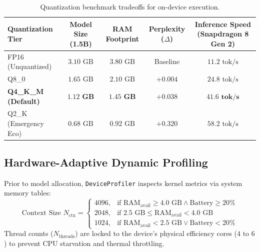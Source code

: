 \documentclass[10.5pt,a4paper]{article}
\begin{document}
\begin{table}[h!]
\centering
\footnotesize
\begin{tabularx}{\textwidth}{lcccc}
\toprule
\textbf{Quantization Tier} & \textbf{Model Size (1.5B)} & \textbf{RAM Footprint} & \textbf{Perplexity ($\Delta$)} & \textbf{Inference Speed (Snapdragon 8 Gen 2)} \\
\midrule
FP16 (Unquantized) & $3.10\text{ GB}$ & $3.80\text{ GB}$ & Baseline & $11.2\text{ tok/s}$ \\
Q8\_0 & $1.65\text{ GB}$ & $2.10\text{ GB}$ & $+0.004$ & $24.8\text{ tok/s}$ \\
\textbf{Q4\_K\_M (Default)} & $\mathbf{1.12\text{ GB}}$ & $\mathbf{1.45\text{ GB}}$ & $\mathbf{+0.038}$ & $\mathbf{41.6\text{ tok/s}}$ \\
Q2\_K (Emergency Eco) & $0.68\text{ GB}$ & $0.92\text{ GB}$ & $+0.320$ & $58.2\text{ tok/s}$ \\
\bottomrule
\end{tabularx}
\caption{Quantization benchmark tradeoffs for on-device execution.}
\label{tab:quantization}
\end{table}

\vspace{-0.2cm}

\subsection{Hardware-Adaptive Dynamic Profiling}
Prior to model allocation, \texttt{DeviceProfiler} inspects kernel metrics via system memory tables:
\begin{equation}
  \text{Context Size } N_{\text{ctx}} = 
  \begin{cases} 
    4096, & \text{if } \text{RAM}_{\text{avail}} \ge 4.0\text{ GB} \land \text{Battery} \ge 20\% \\
    2048, & \text{if } 2.5\text{ GB} \le \text{RAM}_{\text{avail}} < 4.0\text{ GB} \\
    1024, & \text{if } \text{RAM}_{\text{avail}} < 2.5\text{ GB} \lor \text{Battery} < 20\%
  \end{cases}
\end{equation}
Thread counts ($N_{\text{threads}}$) are locked to the device's physical efficiency cores ($4 \text{ to } 6$) to prevent CPU starvation and thermal throttling.
\end{document}
